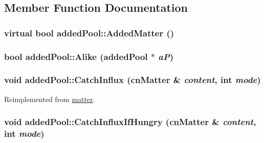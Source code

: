 \subsection{Member Function Documentation}
\hypertarget{classadded_pool_a0bc16d307ad2493bc2765fee91ebd4a0}{
\subsubsection[{AddedMatter}]{\setlength{\rightskip}{0pt plus 5cm}virtual bool addedPool::AddedMatter ()}}
\label{classadded_pool_a0bc16d307ad2493bc2765fee91ebd4a0}
\hypertarget{classadded_pool_abbe1f7d292ff1224735bde06dd38eaa6}{
\subsubsection[{Alike}]{\setlength{\rightskip}{0pt plus 5cm}bool addedPool::Alike ({\bf addedPool} $\ast$ {\em aP})}}
\label{classadded_pool_abbe1f7d292ff1224735bde06dd38eaa6}
\hypertarget{classadded_pool_a67faed29b7b9d747de144920d7299a71}{
\subsubsection[{CatchInflux}]{\setlength{\rightskip}{0pt plus 5cm}void addedPool::CatchInflux ({\bf cnMatter} \& {\em content}, \/  int {\em mode})}}
\label{classadded_pool_a67faed29b7b9d747de144920d7299a71}


Reimplemented from \hyperlink{classmatter_a5ad9b7b66c194958cdf58ec47024c0c9}{matter}.\hypertarget{classadded_pool_afbd54d1de5f10317e091a58e46be0ce3}{
\subsubsection[{CatchInfluxIfHungry}]{\setlength{\rightskip}{0pt plus 5cm}void addedPool::CatchInfluxIfHungry ({\bf cnMatter} \& {\em content}, \/  int {\em mode})}}
\label{classadded_pool_afbd54d1de5f10317e091a58e46be0ce3}


